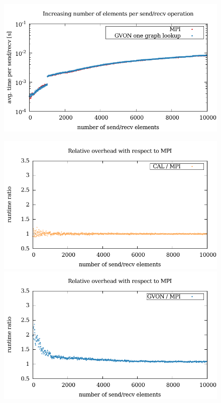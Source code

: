 \begin{figure}[H]
\begin{minipage}[t]{0.5\textwidth}
    \includegraphics[width=\textwidth]{plots/50_nsize_one_lookup_gvon_kepler}
  \end{minipage}%
  \begin{minipage}[t]{0.5\textwidth}
    \includegraphics[width=\textwidth]{plots/50_nsize_overhead_cal_kepler}
    \includegraphics[width=\textwidth]{plots/50_nsize_overhead_gvon_kepler}

\end{minipage}
\end{figure}
